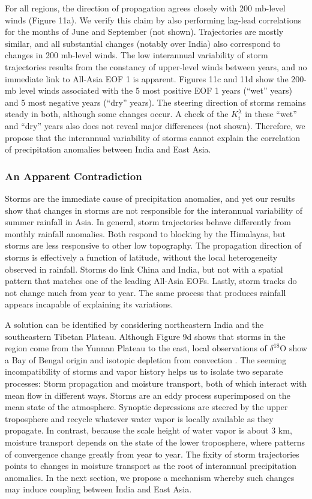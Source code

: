 \documentclass[12pt]{article}
\begin{document}
	 For all regions, the direction of propagation agrees closely with 200 mb-level winds (Figure 11a). We verify this claim by also performing lag-lead correlations for the months of June and September (not shown). Trajectories are mostly similar, and all substantial changes (notably over India) also correspond to changes in 200 mb-level winds. The low interannual variability of storm trajectories results from the constancy of upper-level winds between years, and no immediate link to All-Asia EOF 1 is apparent. Figures 11c and 11d show the 200-mb level winds associated with the 5 most positive EOF 1 years (``wet'' years) and 5 most negative years (``dry'' years). The steering direction of storms remains steady in both, although some changes occur. A check of the $K_i^\lambda$ in these ``wet'' and ``dry'' years also does not reveal major differences (not shown). Therefore, we propose that the interannual variability of storms cannot explain the correlation of precipitation anomalies between India and East Asia.
	 
\subsubsection{An Apparent Contradiction}
	 
	 Storms are the immediate cause of precipitation anomalies, and yet our results show that changes in storms are not responsible for the interannual variability of summer rainfall in Asia. In general, storm trajectories behave differently from monthly rainfall anomalies. Both respond to blocking by the Himalayas, but storms are less responsive to other low topography. The propagation direction of storms is effectively a function of latitude, without the local heterogeneity observed in rainfall. Storms do link China and India, but not with a spatial pattern that matches one of the leading All-Asia EOFs. Lastly, storm tracks do not change much from year to year. The same process that produces rainfall appears incapable of explaining its variations.
	 
	 A solution can be identified by considering northeastern India and the southeastern Tibetan Plateau. Although Figure 9d shows that storms in the region come from the Yunnan Plateau to the east, local observations of $\delta^{18}$O show a Bay of Bengal origin and isotopic depletion from convection \citep{Gao2011}. The seeming incompatibility of storms and vapor history helps us to isolate two separate processes: Storm propagation and moisture transport, both of which interact with mean flow in different ways. Storms are an eddy process superimposed on the mean state of the atmosphere. Synoptic depressions are steered by the upper troposphere and recycle whatever water vapor is locally available as they propagate. In contrast, because the scale height of water vapor is about 3 km, moisture transport depends on the state of the lower troposphere, where patterns of convergence change greatly from year to year. The fixity of storm trajectories points to changes in moisture transport as the root of interannual precipitation anomalies. In the next section, we propose a mechanism whereby such changes may induce coupling between India and East Asia.
	
\end{document}
